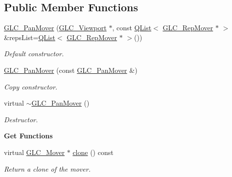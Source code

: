 \subsection*{Public Member Functions}
\begin{DoxyCompactItemize}
\item 
\hyperlink{class_g_l_c___pan_mover_a19e065e845663b9977ce879b2d928ce3}{G\-L\-C\-\_\-\-Pan\-Mover} (\hyperlink{class_g_l_c___viewport}{G\-L\-C\-\_\-\-Viewport} $\ast$, const \hyperlink{class_q_list}{Q\-List}$<$ \hyperlink{class_g_l_c___rep_mover}{G\-L\-C\-\_\-\-Rep\-Mover} $\ast$ $>$ \&reps\-List=\hyperlink{class_q_list}{Q\-List}$<$ \hyperlink{class_g_l_c___rep_mover}{G\-L\-C\-\_\-\-Rep\-Mover} $\ast$ $>$())
\begin{DoxyCompactList}\small\item\em Default constructor. \end{DoxyCompactList}\item 
\hyperlink{class_g_l_c___pan_mover_a745e98bf60de6f0153f3ebd7adc7e4ee}{G\-L\-C\-\_\-\-Pan\-Mover} (const \hyperlink{class_g_l_c___pan_mover}{G\-L\-C\-\_\-\-Pan\-Mover} \&)
\begin{DoxyCompactList}\small\item\em Copy constructor. \end{DoxyCompactList}\item 
virtual \hyperlink{class_g_l_c___pan_mover_a19939a89f3271f68630c928e57805d7d}{$\sim$\-G\-L\-C\-\_\-\-Pan\-Mover} ()
\begin{DoxyCompactList}\small\item\em Destructor. \end{DoxyCompactList}\end{DoxyCompactItemize}
\begin{Indent}{\bf Get Functions}\par
\begin{DoxyCompactItemize}
\item 
virtual \hyperlink{class_g_l_c___mover}{G\-L\-C\-\_\-\-Mover} $\ast$ \hyperlink{class_g_l_c___pan_mover_ae2a9e72d2db9d2d1da67c12561b3b5cf}{clone} () const 
\begin{DoxyCompactList}\small\item\em Return a clone of the mover. \end{DoxyCompactList}\end{DoxyCompactItemize}
\end{Indent}
